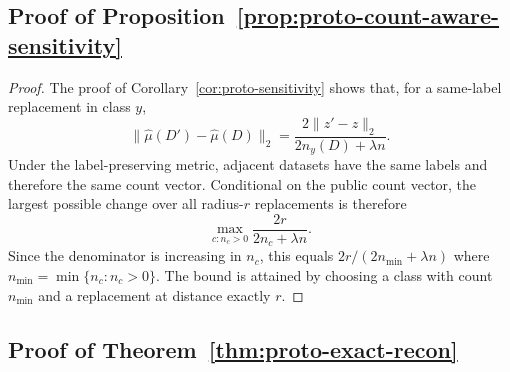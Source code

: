 \documentclass[conference,compsoc]{IEEEtran}
\begin{document}
\subsection{Proof of Proposition~\ref{prop:proto-count-aware-sensitivity}}

\begin{proof}
The proof of Corollary~\ref{cor:proto-sensitivity} shows that, for a same-label replacement in class $y$,
\[
\|\widehat\mu(D')-\widehat\mu(D)\|_2
=
\frac{2\|z'-z\|_2}{2n_y(D)+\lambda n}.
\]
Under the label-preserving metric, adjacent datasets have the same labels and therefore the same count vector. Conditional on the public count vector, the largest possible change over all radius-$r$ replacements is therefore
\[
\max_{c:n_c>0}\frac{2r}{2n_c+\lambda n}.
\]
Since the denominator is increasing in $n_c$, this equals $2r/(2n_{\min}+\lambda n)$ where $n_{\min}=\min\{n_c:n_c>0\}$. The bound is attained by choosing a class with count $n_{\min}$ and a replacement at distance exactly $r$.
\end{proof}


\subsection{Proof of Theorem~\ref{thm:proto-exact-recon}}
\end{document}
